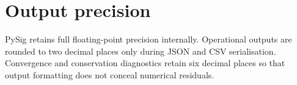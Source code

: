 \section{Output precision}
PySig retains full floating-point precision internally. Operational outputs are rounded to two decimal places only during JSON and CSV serialisation. Convergence and conservation diagnostics retain six decimal places so that output formatting does not conceal numerical residuals.
